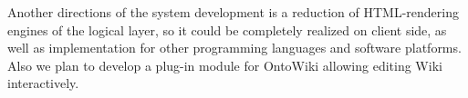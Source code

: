 \documentclass[conference]{IEEEtran}
\begin{document}
Another directions of the system development is a reduction of HTML-rendering engines of the logical layer, so it could be completely realized on client side, as well as implementation for other programming languages and software platforms. Also we plan to develop a plug-in module for OntoWiki allowing editing Wiki interactively.






%
%



%
%
\end{document}
